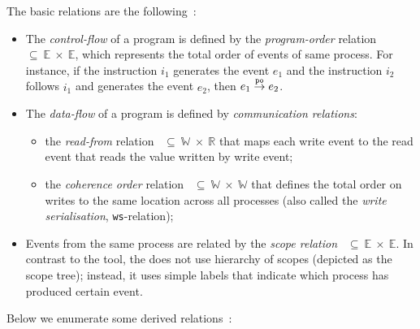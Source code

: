\vspace{1em}
The basic relations are the following~\cite{alglave2010shared}:
\begin{itemize}
    \item The \textit{control-flow} of a program is defined by the \textit{program-order} relation \po~$\subseteq~\mathbb{E}~\times~\mathbb{E}$, which represents the total order of events of same process.
    For instance, if the instruction $i_1$ generates the event $e_1$ and the instruction $i_2$ follows $i_1$ and generates the event $e_2$, then $e_1 \overset{\mathtt{po}}{\rightarrow} e_2$.

    \item The \textit{data-flow} of a program is defined by \textit{communication relations}:
    \begin{itemize}[noitemsep]
        \item the \textit{read-from} relation \rf{}~$\subseteq~\mathbb{W}~\times~\mathbb{R}$ that maps each write event to the read event that reads the value written by write event;
        \item the \textit{coherence order} relation \co{}~$\subseteq~\mathbb{W}~\times~\mathbb{W}$ that defines the total order on writes to the same location across all processes (also called the \textit{write serialisation}, \texttt{ws}-relation);
    \end{itemize}

    \item Events from the same process are related by the \textit{scope relation} \sr{}~$\subseteq~\mathbb{E}~\times~\mathbb{E}$.
    In contrast to the  tool, the \porthos[2] does not use hierarchy of scopes (depicted as the scope tree); instead, it uses simple labels that indicate which process has produced certain event.
\end{itemize}


Below we enumerate some derived relations~\cite{alglave2010shared}:

